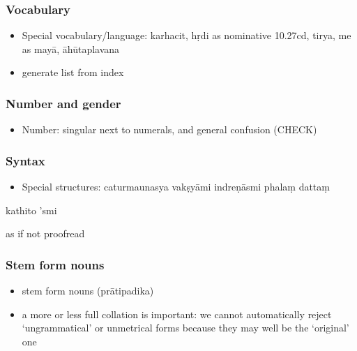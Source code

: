 \documentclass[11pt]{book}
\begin{document}
\subsubsection{Vocabulary}

\begin{itemize}

\item
  Special vocabulary/language: karhacit, hṛdi as nominative 10.27cd,
  tirya, me as mayā, āhūtaplavana
\item
  generate list from index
\end{itemize}


\subsubsection{Number and gender}

\begin{itemize}

\item
  Number: singular next to numerals, and general confusion (CHECK)
\end{itemize}


\subsubsection{Syntax}

\begin{itemize}

\item
  Special structures: caturmaunasya vakṣyāmi indreṇāsmi phalaṃ dattaṃ
\end{itemize}

kathito 'smi

as if not proofread

\subsubsection{Stem form nouns}

\begin{itemize}
\item
  stem form nouns (prātipadika)
\item
  a more or less full collation is important: we cannot automatically
  reject `ungrammatical' or unmetrical forms because they may well be
  the `original' one
\end{itemize}




\vfill
\pagebreak
\end{document}
